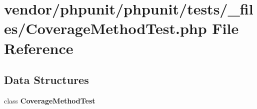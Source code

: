 \section{vendor/phpunit/phpunit/tests/\+\_\+files/\+Coverage\+Method\+Test.php File Reference}
\label{phpunit_2tests_2__files_2_coverage_method_test_8php}
\subsection*{Data Structures}
\begin{DoxyCompactItemize}
\item 
class {\bf Coverage\+Method\+Test}
\end{DoxyCompactItemize}
